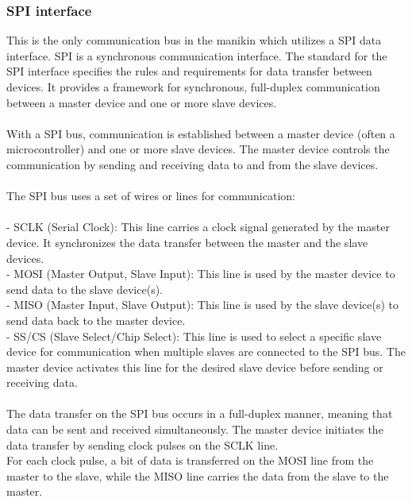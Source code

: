 \subsubsection{SPI interface}
This is the only communication bus in the manikin which utilizes a SPI data interface. SPI is a synchronous communication interface. The standard for the SPI interface specifies the rules and requirements for data transfer between devices. It provides a framework for synchronous, full-duplex communication between a master device and one or more slave devices.\\\\
With a SPI bus, communication is established between a master device (often a microcontroller) and one or more slave devices. The master device controls the communication by sending and receiving data to and from the slave devices.\\\\
The SPI bus uses a set of wires or lines for communication:\\\\
- SCLK (Serial Clock): This line carries a clock signal generated by the master device. It synchronizes the data transfer between the master and the slave devices.\\
- MOSI (Master Output, Slave Input): This line is used by the master device to send data to the slave device(s).\\
- MISO (Master Input, Slave Output): This line is used by the slave device(s) to send data back to the master device.\\
- SS/CS (Slave Select/Chip Select): This line is used to select a specific slave device for communication when multiple slaves are connected to the SPI bus. The master device activates this line for the desired slave device before sending or receiving data.\\\\
The data transfer on the SPI bus occurs in a full-duplex manner, meaning that data can be sent and received simultaneously. The master device initiates the data transfer by sending clock pulses on the SCLK line.\\ For each clock pulse, a bit of data is transferred on the MOSI line from the master to the slave, while the MISO line carries the data from the slave to the master.\\\\

